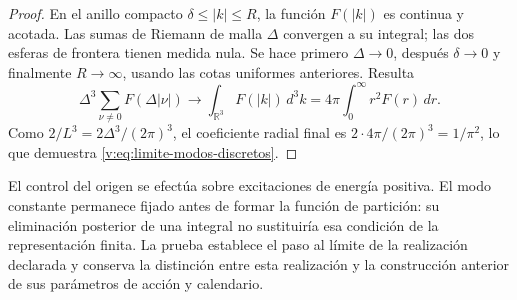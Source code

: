 \begin{proof}
En el anillo compacto \(\delta\leq|k|\leq R\), la función
\(F(|k|)\) es continua y acotada. Las sumas de Riemann de malla
\(\Delta\) convergen a su integral; las dos esferas de frontera
tienen medida nula. Se hace primero \(\Delta\to0\), después
\(\delta\to0\) y finalmente \(R\to\infty\), usando las cotas
uniformes anteriores. Resulta
\[
 \Delta^3\sum_{\nu\ne0}F(\Delta|\nu|)
 \longrightarrow \int_{\mathbb R^3}F(|k|)\,d^3k
 =4\pi\int_0^\infty r^2F(r)\,dr.
\]
Como \(2/L^3=2\Delta^3/(2\pi)^3\), el coeficiente radial final
es \(2\cdot4\pi/(2\pi)^3=1/\pi^2\), lo que demuestra
\eqref{v:eq:limite-modos-discretos}.
\end{proof}

El control del origen se efectúa sobre excitaciones de energía positiva.
El modo constante permanece fijado antes de formar la función de partición:
su eliminación posterior de una integral no sustituiría esa condición de
la representación finita. La prueba establece el paso al límite de la
realización declarada y conserva la distinción entre esta realización y
la construcción anterior de sus parámetros de acción y calendario.
